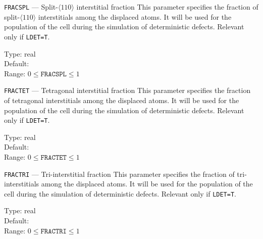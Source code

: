 \ifprivate
\begin{keydescription}{\texttt{FRACSPL} --- Split-$\langle 110 \rangle$ interstitial fraction}
%
  This parameter specifies the fraction of split-$\langle 110 \rangle$
  interstitials among the displaced atoms. It will be used for
  the population of the cell during the simulation of deterministic defects.
  Relevant only if \texttt{LDET=T}. 
  \begin{keytab}
    Type:    \> real \\
    Default:  \\
    Range:   \> $0 \le \texttt{FRACSPL} \le 1$
  \end{keytab}
\end{keydescription}


\begin{keydescription}{\texttt{FRACTET} --- Tetragonal interstitial fraction}
%
  This parameter specifies the fraction of tetragonal interstitials among
  the displaced atoms. It will be used for the population of the cell during
  the simulation of deterministic defects. Relevant only if
  \texttt{LDET=T}. 
  \begin{keytab}
    Type:    \> real \\
    Default:  \\
    Range:   \> $0 \le \texttt{FRACTET} \le 1$
  \end{keytab}
\end{keydescription}

\begin{keydescription}{\texttt{FRACTRI} --- Tri-interstitial fraction}
%
  This parameter specifies the fraction of tri-interstitials among the
  displaced atoms. It will be used for the population of the cell during the
  simulation of deterministic defects. Relevant only if
  \texttt{LDET=T}. 
  \begin{keytab}
    Type:    \> real \\
    Default:  \\
    Range:   \> $0 \le \texttt{FRACTRI} \le 1$
  \end{keytab}
\end{keydescription}
\fi

